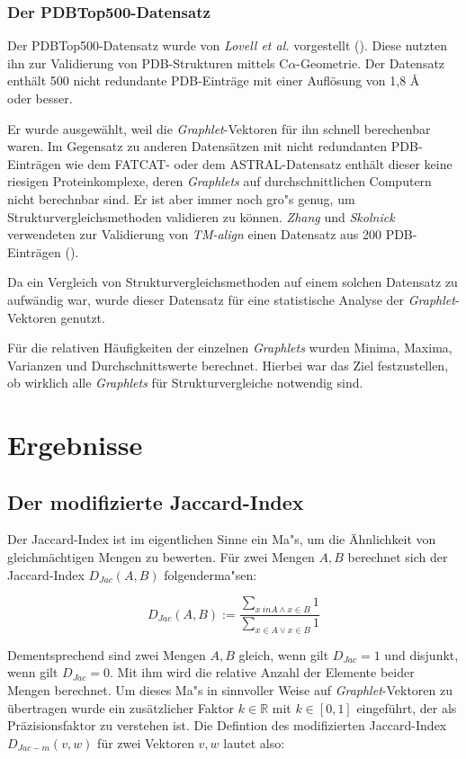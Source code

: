\documentclass{report}
\begin{document}
\subsection{Der PDBTop500-Datensatz}

Der PDBTop500-Datensatz wurde von \textit{Lovell et al.} vorgestellt (\cite{top500}). Diese nutzten ihn zur Validierung von PDB-Strukturen mittels C$\alpha$-Geometrie.
Der Datensatz enth\"alt 500 nicht redundante PDB-Eintr\"age mit einer Aufl\"osung von 1,8 \AA \\
oder besser.

Er wurde ausgew\"ahlt, weil die \textit{Graphlet}-Vektoren f\"ur ihn schnell berechenbar waren. Im Gegensatz zu anderen Datens\"atzen mit nicht redundanten PDB-Eintr\"agen wie dem FATCAT- oder dem ASTRAL-Datensatz enth\"alt dieser keine riesigen Proteinkomplexe, deren \textit{Graphlets} auf durchschnittlichen Computern nicht berechnbar sind. 
Er ist aber immer noch gro"s genug, um Strukturvergleichsmethoden validieren zu k\"onnen. \textit{Zhang} und \textit{Skolnick} verwendeten zur Validierung von \textit{TM-align} einen Datensatz aus 200 PDB-Eintr\"agen (\cite{zhangtm}).

Da ein Vergleich von Strukturvergleichsmethoden auf einem solchen Datensatz zu aufw\"andig war, wurde dieser Datensatz f\"ur eine statistische Analyse der \textit{Graphlet}-Vektoren genutzt.

F\"ur die relativen H\"aufigkeiten der einzelnen \textit{Graphlets} wurden Minima, Maxima, Varianzen und Durchschnittswerte berechnet. Hierbei war das Ziel festzustellen, ob wirklich alle \textit{Graphlets} f\"ur Strukturvergleiche notwendig sind.


\chapter{Ergebnisse}

\section{Der modifizierte Jaccard-Index}


Der Jaccard-Index ist im eigentlichen Sinne ein Ma"s, um die \"Ahnlichkeit von gleichm\"achtigen Mengen zu bewerten. F\"ur zwei Mengen $A,B$ berechnet sich der Jaccard-Index $D_{Jac}(A,B)$ folgenderma"sen:

\[ D_{Jac}(A,B) := \frac{\sum_{x \ in A \land x \in B} 1}{\sum_{x \in A \lor x \in B} 1} \]

Dementsprechend sind zwei Mengen $A,B$ gleich, wenn  gilt $D_{Jac} = 1$ und disjunkt, wenn gilt $D_{Jac} = 0$. Mit ihm wird die relative Anzahl der Elemente beider Mengen berechnet.
Um dieses Ma"s in sinnvoller Weise auf \textit{Graphlet}-Vektoren zu \"ubertragen wurde ein zus\"atzlicher Faktor $k \in \mathbb{R} $ mit $k \in [0,1]$  eingef\"uhrt, der als Pr\"azisionsfaktor zu verstehen ist. Die Defintion des modifizierten Jaccard-Index $D_{Jac-m}(v,w)$ f\"ur zwei Vektoren $v,w$ lautet also:
\end{document}
